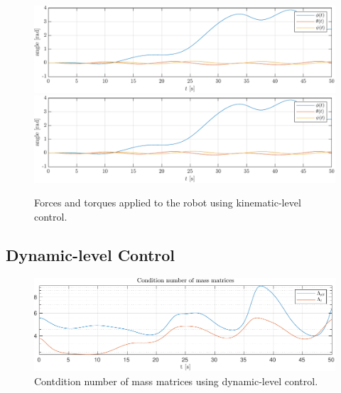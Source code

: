 \begin{figure}[h!]
    \centering
    \includegraphics[page=7,width=\linewidth]{assets/results/kinematic/plot.pdf}
    \includegraphics[page=8,width=\linewidth]{assets/results/kinematic/plot.pdf}
    \caption{Forces and torques applied to the robot using kinematic-level control.}
\end{figure}





\FloatBarrier
\subsection{Dynamic-level Control}

\begin{figure}[h!]
    \centering
    \includegraphics[page=1,width=\linewidth]{assets/results/dynamic/h5data.pdf}
    \caption{Contdition number of mass matrices using dynamic-level control.}
    \label{}
\end{figure}

